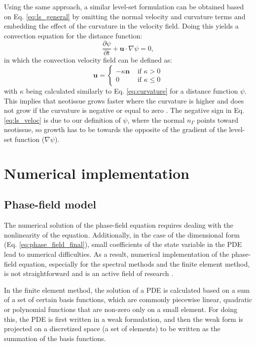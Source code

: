 Using the same approach, a similar level-set formulation can be obtained based on Eq. \ref{eq:ls_general} by omitting the normal velocity and curvature terms and embedding the effect of the curvature in the velocity field. Doing this yields a convection equation for the distance function:
\begin{equation} \label{eq:ls_advect}
\frac{\partial \psi}{\partial t}+\boldsymbol{u} \cdot \nabla \psi=0,
\end{equation}
in which the convection velocity field can be defined as:
\begin{equation} \label{eq:ls_veloc}
\boldsymbol{u}=\left\{\begin{array}{ll}
-\kappa \boldsymbol{n} & \text { if } \kappa>0 \\
0 & \text { if } \kappa \leq 0
\end{array}\right.
\end{equation}
with $\kappa$ being calculated similarly to Eq. \ref{eq:curvature} for a distance function $\psi$. This implies that neotissue grows faster where the curvature is higher and does not grow if the curvature is negative or equal to zero \cite{Bidan2012}. The negative sign in Eq. \ref{eq:ls_veloc} is due to our definition of $\psi$, where the normal $n_\Gamma$  points toward neotissue, so growth has to be towards the opposite of the gradient of the level-set function ($ \nabla \psi$).

\section{Numerical implementation}

\subsection{Phase-field model}

The numerical solution of the phase-field equation requires dealing with the nonlinearity of the equation. Additionally, in the case of the dimensional form (Eq. \ref{eq:phase_field_final}), small coefficients of the state variable in the \gls{PDE} lead to numerical difficulties. As a result, numerical implementation of the phase-field equation, especially for the spectral methods and the finite element method, is not straightforward and is an active field of research \cite{Shen2010,Abboud2019}.

In the finite element method, the solution of a \gls{PDE} is calculated based on a sum of a set of certain basis functions, which are commonly piecewise linear, quadratic or polynomial functions that are non-zero only on a small element. For doing this, the \gls{PDE} is first written in a weak formulation, and then the weak form is projected on a discretized space (a set of elements) to be written as the summation of the basis functions.


